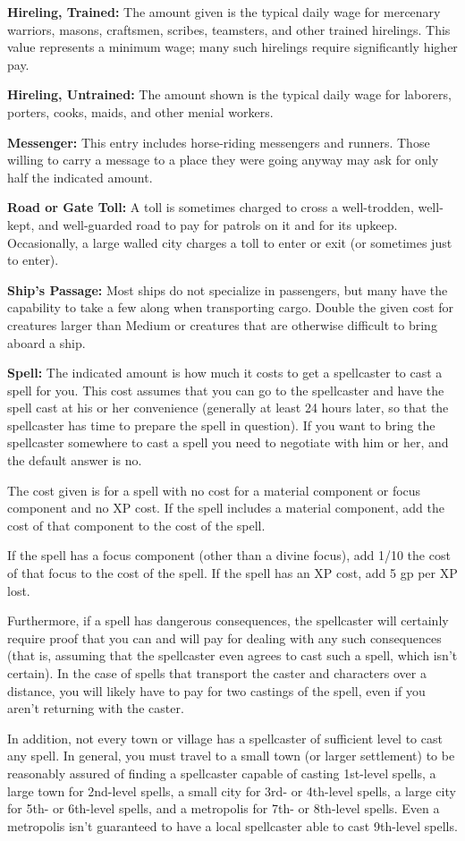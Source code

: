 \textbf{Hireling, Trained:} The amount given is the typical daily wage for mercenary 
warriors, masons, craftsmen, scribes, teamsters, and other trained hirelings. This 
value represents a minimum wage; many such hirelings require significantly higher 
pay.

\textbf{Hireling, Untrained:} The amount shown is the typical daily wage for laborers, 
porters, cooks, maids, and other menial workers.

\textbf{Messenger:} This entry includes horse-riding messengers and runners. Those 
willing to carry a message to a place they were going anyway may ask for only half 
the indicated amount.

\textbf{Road or Gate Toll:} A toll is sometimes charged to cross a well-trodden, 
well-kept, and well-guarded road to pay for patrols on it and for its upkeep. Occasionally, 
a large walled city charges a toll to enter or exit (or sometimes just to enter).

\textbf{Ship's Passage:} Most ships do not specialize in passengers, but many have 
the capability to take a few along when transporting cargo. Double the given cost 
for creatures larger than Medium or creatures that are otherwise difficult to bring 
aboard a ship.

\textbf{Spell:} The indicated amount is how much it costs to get a spellcaster 
to cast a spell for you. This cost assumes that you can go to the spellcaster and 
have the spell cast at his or her convenience (generally at least 24 hours later, 
so that the spellcaster has time to prepare the spell in question). If you want 
to bring the spellcaster somewhere to cast a spell you need to negotiate with him 
or her, and the default answer is no.

The cost given is for a spell with no cost for a material component or focus component 
and no XP cost. If the spell includes a material component, add the cost of that 
component to the cost of the spell.

If the spell has a focus component (other than a divine focus), add 1/10 the cost 
of that focus to the cost of the spell. If the spell has an XP cost, add 5 gp per 
XP lost. 

Furthermore, if a spell has dangerous consequences, the spellcaster will certainly 
require proof that you can and will pay for dealing with any such consequences 
(that is, assuming that the spellcaster even agrees to cast such a spell, which 
isn't certain). In the case of spells that transport the caster and characters 
over a distance, you will likely have to pay for two castings of the spell, even 
if you aren't returning with the caster.

In addition, not every town or village has a spellcaster of sufficient level to 
cast any spell. In general, you must travel to a small town (or larger settlement) 
to be reasonably assured of finding a spellcaster capable of casting 1st-level 
spells, a large town for 2nd-level spells, a small city for 3rd- or 4th-level spells, 
a large city for 5th- or 6th-level spells, and a metropolis for 7th- or 8th-level 
spells. Even a metropolis isn't guaranteed to have a local spellcaster able to 
cast 9th-level spells.

